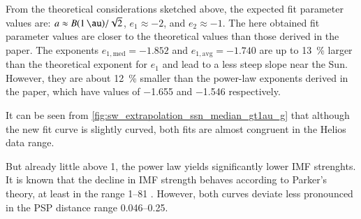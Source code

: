 From the theoretical considerations sketched above, the expected fit parameter values are: \mbox{$a \approx B(\SI{1}{\au}) / \sqrt{2}$}, $e_1 \approx -2$, and $e_2 \approx -1$. The here obtained fit parameter values are closer to the theoretical values than those derived in the paper. The exponents $e_{1, \text{med}} = -1.852$ and $e_{1, \text{avg}} = -1.740$ are up to \SI{13}{\%} larger than the theoretical exponent for $e_1$ and lead to a less steep slope near the Sun. However, they are about \SI{12}{\%} smaller than the power-law exponents derived in the paper, which have values of \num{-1.655} and \num{-1.546} respectively.

It can be seen from \autoref{fig:sw_extrapolation_ssn_median_gt1au_g} that although the new fit curve is slightly curved, both fits are almost congruent in the Helios data range.
\begin{figure}[htb]
\end{figure}
But already little above \SI{1}{\au}, the power law yields significantly lower IMF strenghts. It is known that the decline in IMF strength behaves according to Parker's theory, at least in the range \SIrange{1}{81}{\au} \citep{Burlaga2002}. However, both curves deviate less pronounced in the PSP distance range \SIrange{0.046}{0.25}{\au}.

